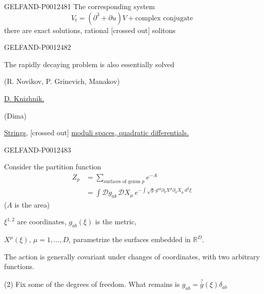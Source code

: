 \begin{GelfandAdjacentEvidence}{GELFAND-P001248}{1}
The corresponding system
\begin{equation*}
V_t=(\partial^3+\partial u)V+\text{complex conjugate}\tag{23}
\end{equation*}
there are exact solutions, rational [crossed out] solitons
\end{GelfandAdjacentEvidence}
\begin{GelfandAdjacentEvidence}{GELFAND-P001248}{2}


The rapidly decaying problem is also essentially solved

(R. Novikov, P. Grinevich, Manakov)

\underline{\underline{D. Knizhnik.}}

(Dima)

\underline{Strings,} [crossed out] \underline{moduli spaces, quadratic differentials.}
\end{GelfandAdjacentEvidence}
\begin{GelfandAdjacentEvidence}{GELFAND-P001248}{3}


Consider the partition function
\begin{equation*}
\begin{aligned}
Z_p&=\sum_{\text{surfaces of genus }p}e^{-A}\\
&=\int\mathcal Dg_{ab}\,\mathcal DX_\mu\,
 e^{-\int\sqrt g\,g^{ab}\partial_bX^\mu\partial_aX_\mu\,d^2\xi}
\end{aligned}\tag{1}
\end{equation*}
($A$ is the area)

$\xi^{1,2}$ are coordinates, $g_{ab}(\xi)$ is the metric,

$X^\mu(\xi)$, $\mu=1,\ldots,D$, parametrize the surfaces embedded in $\mathbb R^D$.

The action is generally covariant under changes of coordinates, with two arbitrary functions.

(2) Fix some of the degrees of freedom. What remains is $g_{ab}=\overset{?}{g}(\xi)\delta_{ab}$
\end{GelfandAdjacentEvidence}
